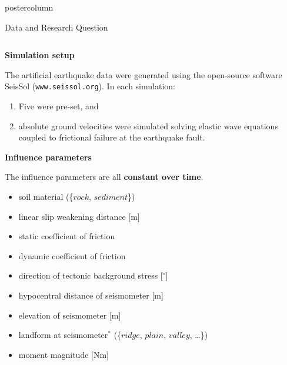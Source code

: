 \documentclass[final,hyperref={pdfpagelabels=false}]{beamer}
\newcommand{\bfBlue}[1]{\textcolor{koaladarkestblue}{\textbf{#1}}}
\begin{document}
\begin{frame}
\begin{columns}
\begin{column}{1\textwidth}
\begin{beamercolorbox}[center,wd=\textwidth]{postercolumn}
\begin{minipage}[T]{.95\textwidth}
\begin{block}{\footnotesize Data and Research Question}
\begin{columns}[t]
  \begin{column}{.35\textwidth}
  \vspace{-3ex}
  \begin{center}
  \bfBlue{Simulation setup}
  \end{center}
   The artificial earthquake data were generated using the open-source software SeisSol (\texttt{www.seissol.org}). In each simulation:
  \begin{enumerate}
    \item Five  were pre-set, and
    \item absolute ground velocities were simulated solving elastic wave equations coupled to frictional failure at the earthquake fault.
  \end{enumerate}
  \vspace{2ex}
  \begin{center}
  \bfBlue{Influence parameters}
  \end{center}
  The influence parameters are all \bfBlue{constant over time}.
  \hspace{-2pt}
  \begin{tcolorbox}[colframe=chocolate4,colback=verylightgray,boxrule=2pt,arc=4pt,
  left=-5pt]
  \begin{itemize} \footnotesize
    \item soil material (\{$rock$, $sediment$\})
    \item linear slip weakening distance [m]
    \item static coefficient of friction
    \item dynamic coefficient of friction
    \item direction of tectonic background stress [$^\circ$]
  \end{itemize}
  \end{tcolorbox}
  \vspace{-10px}
  \begin{itemize} \footnotesize
    \item hypocentral distance of seismometer [m]
    \item elevation of seismometer [m]
    \item landform at seismometer$^\ast$ (\{$ridge$, $plain$, $valley$, \ldots\})
    \item moment magnitude [Nm]
  \end{itemize}
  \vspace{1ex}

\end{column}
\end{columns}
\end{block}
\end{minipage}
\end{beamercolorbox}
\end{column}
\end{columns}
\end{frame}
\end{document}
